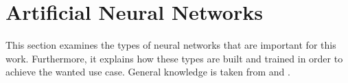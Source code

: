 \section{Artificial Neural Networks}
\label{sec:neural-networks}
This section examines the types of neural networks that are important for this work.
Furthermore, it explains how these types are built and trained in order to achieve the wanted use case.
General knowledge is taken from \cite{Goodfellow-et-al-2016} and \cite{cs231n}.






